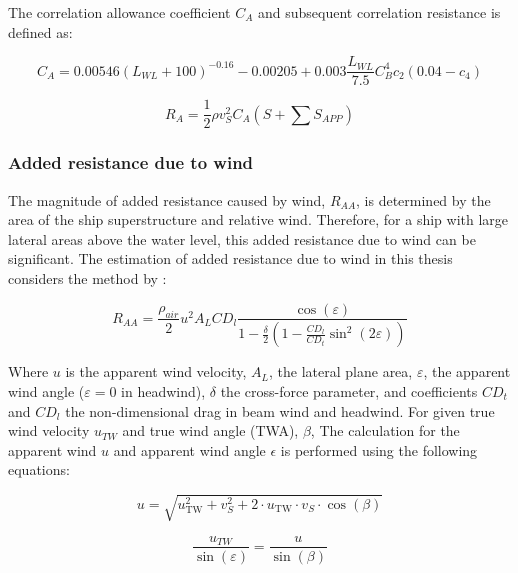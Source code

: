 The correlation allowance coefficient $C_A$ and subsequent correlation resistance is defined as:

\begin{equation}
    \label{eqn:Ca_correlation}
    C_A = 0.00546(L_{WL}+100)^{-0.16} - 0.00205 + 0.003\frac{L_{WL}}{7.5}C_{B}^4c_2(0.04-c_4)
\end{equation}

\begin{equation}
    \label{eqn:R_a}
    R_A = \frac{1}{2}\rho v_S^2 C_A (S+\sum S_{APP})
\end{equation}

\subsubsection{Added resistance due to wind}\label{sec:wind_resistance}

The magnitude of added resistance caused by wind, $R_{AA}$, is determined by the area of the ship superstructure and relative wind. Therefore, for a ship with large lateral areas above the water level, this added resistance due to wind can be significant. The estimation of added resistance due to wind in this thesis considers the method by :

\begin{equation}
    \label{eqn:Raa_blendermann}
    R_{AA} = \frac{\rho_{air}}{2}u^2A_{L}CD_l \frac{\cos{(\varepsilon)}}{1-\frac{\delta}{2}(1-\frac{CD_l}{CD_t}\sin^2{(2\varepsilon)})}
\end{equation}

Where $u$ is the apparent wind velocity, $A_L$, the lateral plane area, $\varepsilon$, the apparent wind angle ($\varepsilon = 0$ in headwind), $\delta$ the cross-force parameter, and coefficients $CD_t$ and $CD_l$ the non-dimensional drag in beam wind and headwind. For given true wind velocity $u_{TW}$ and true wind angle (TWA), $\beta$, The calculation for the apparent wind $u$ and apparent wind angle $\epsilon$ is performed using the following equations:

\begin{equation}
    \label{eqn:u_AW}
    u = \sqrt{u_{\text{TW}}^2 + v_S^2 + 2 \cdot u_{\text{TW}} \cdot v_S \cdot \cos(\beta)}
\end{equation}

\begin{equation}
    \label{eqn:epsilon_AWA}
    \frac{u_{TW}}{\sin(\varepsilon)} = \frac{u}{\sin({\beta})}
\end{equation}

